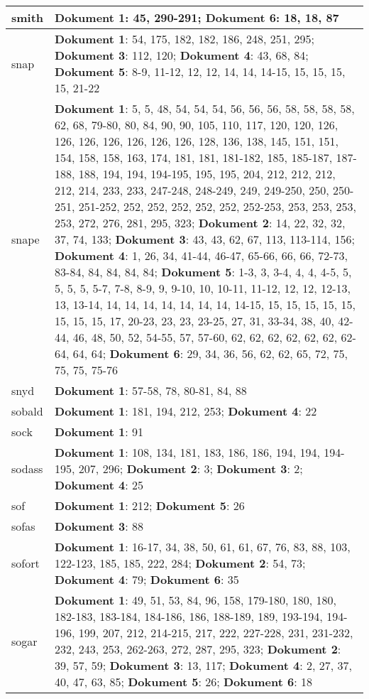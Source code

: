 \documentclass[a5paper]{article}
\begin{document}
\begin{longtable}[l]{|l|p{3in}|}
\hline
smith & \textbf{Dokument 1}: 45, 290-291; \textbf{Dokument 6}: 18, 18, 87 \\
\hline
snap & \textbf{Dokument 1}: 54, 175, 182, 182, 186, 248, 251, 295; \textbf{Dokument 3}: 112, 120; \textbf{Dokument 4}: 43, 68, 84; \textbf{Dokument 5}: 8-9, 11-12, 12, 12, 14, 14, 14-15, 15, 15, 15, 15, 21-22 \\
\hline
snape & \textbf{Dokument 1}: 5, 5, 48, 54, 54, 54, 56, 56, 56, 58, 58, 58, 58, 62, 68, 79-80, 80, 84, 90, 90, 105, 110, 117, 120, 120, 126, 126, 126, 126, 126, 126, 126, 128, 136, 138, 145, 151, 151, 154, 158, 158, 163, 174, 181, 181, 181-182, 185, 185-187, 187-188, 188, 194, 194, 194-195, 195, 195, 204, 212, 212, 212, 212, 214, 233, 233, 247-248, 248-249, 249, 249-250, 250, 250-251, 251-252, 252, 252, 252, 252, 252, 252-253, 253, 253, 253, 253, 272, 276, 281, 295, 323; \textbf{Dokument 2}: 14, 22, 32, 32, 37, 74, 133; \textbf{Dokument 3}: 43, 43, 62, 67, 113, 113-114, 156; \textbf{Dokument 4}: 1, 26, 34, 41-44, 46-47, 65-66, 66, 66, 72-73, 83-84, 84, 84, 84, 84; \textbf{Dokument 5}: 1-3, 3, 3-4, 4, 4, 4-5, 5, 5, 5, 5, 5-7, 7-8, 8-9, 9, 9-10, 10, 10-11, 11-12, 12, 12, 12-13, 13, 13-14, 14, 14, 14, 14, 14, 14, 14, 14-15, 15, 15, 15, 15, 15, 15, 15, 15, 17, 20-23, 23, 23, 23-25, 27, 31, 33-34, 38, 40, 42-44, 46, 48, 50, 52, 54-55, 57, 57-60, 62, 62, 62, 62, 62, 62, 62-64, 64, 64; \textbf{Dokument 6}: 29, 34, 36, 56, 62, 62, 65, 72, 75, 75, 75, 75-76 \\
\hline
snyd & \textbf{Dokument 1}: 57-58, 78, 80-81, 84, 88 \\
\hline
sobald & \textbf{Dokument 1}: 181, 194, 212, 253; \textbf{Dokument 4}: 22 \\
\hline
sock & \textbf{Dokument 1}: 91 \\
\hline
sodass & \textbf{Dokument 1}: 108, 134, 181, 183, 186, 186, 194, 194, 194-195, 207, 296; \textbf{Dokument 2}: 3; \textbf{Dokument 3}: 2; \textbf{Dokument 4}: 25 \\
\hline
sof & \textbf{Dokument 1}: 212; \textbf{Dokument 5}: 26 \\
\hline
sofas & \textbf{Dokument 3}: 88 \\
\hline
sofort & \textbf{Dokument 1}: 16-17, 34, 38, 50, 61, 61, 67, 76, 83, 88, 103, 122-123, 185, 185, 222, 284; \textbf{Dokument 2}: 54, 73; \textbf{Dokument 4}: 79; \textbf{Dokument 6}: 35 \\
\hline
sogar & \textbf{Dokument 1}: 49, 51, 53, 84, 96, 158, 179-180, 180, 180, 182-183, 183-184, 184-186, 186, 188-189, 189, 193-194, 194-196, 199, 207, 212, 214-215, 217, 222, 227-228, 231, 231-232, 232, 243, 253, 262-263, 272, 287, 295, 323; \textbf{Dokument 2}: 39, 57, 59; \textbf{Dokument 3}: 13, 117; \textbf{Dokument 4}: 2, 27, 37, 40, 47, 63, 85; \textbf{Dokument 5}: 26; \textbf{Dokument 6}: 18 \\

\end{longtable}
\end{document}
